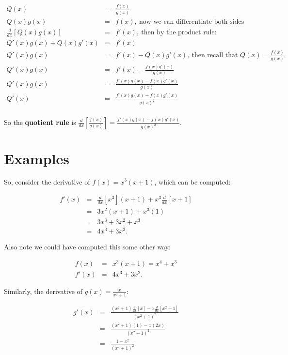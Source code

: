 \documentclass[10pt]{article}
\theoremstyle{definition}
\begin{document}
\begin{eqnarray*}
Q(x)&=&\frac{f(x)}{g(x)}\\
Q(x)g(x)&=&f(x),\ \text{now we can differentiate both sides}\\
\frac{d}{dx}[Q(x)g(x)]&=&f'(x),\ \text{then by the product rule:}\\
Q'(x)g(x)+Q(x)g'(x)&=&f'(x)\\
Q'(x)g(x)&=&f'(x)-Q(x)g'(x),\ \text{then recall that  $Q(x)=\frac{f(x)}{g(x)}$}\\
Q'(x)g(x)&=&f'(x)-\frac{f(x)g'(x)}{g(x)}\\
Q'(x)g(x)&=&\frac{f'(x)g(x)-f(x)g'(x)}{g(x)}\\
Q'(x)&=&\frac{f'(x)g(x)-f(x)g'(x)}{g(x)^2}\\
\end{eqnarray*}


So the {\bf quotient rule} is $\frac{d}{dx}[\frac{f(x)}{g(x)}]=\frac{f'(x)g(x)-f(x)g'(x)}{g(x)^2}$.


\section{Examples}

So, consider the derivative of $f(x)=x^3(x+1)$, which can be computed:

\begin{eqnarray*}
f'(x)&=&\frac{d}{dx}[x^3](x+1)+x^3\frac{d}{dx}[x+1]\\
&=&3x^2(x+1)+x^3(1)\\
&=&3x^3+3x^2+x^3\\
&=&4x^3+3x^2.
\end{eqnarray*}

Also note we could have computed this some other way:

\begin{eqnarray*}
f(x)&=&x^3(x+1)=x^4+x^3\\
f'(x)&=&4x^3+3x^2.
\end{eqnarray*}

Similarly, the derivative of $g(x)=\frac{x}{x^2+1}$:

\begin{eqnarray*}
g'(x)&=&\frac{(x^2+1)\frac{d}{dx}[x]-x\frac{d}{dx}[x^2+1]}{(x^2+1)^2}\\
&=&\frac{(x^2+1)(1)-x(2x)}{(x^2+1)^2}\\
&=&\frac{1-x^2}{(x^2+1)^2}\\
\end{eqnarray*}
\end{document}
